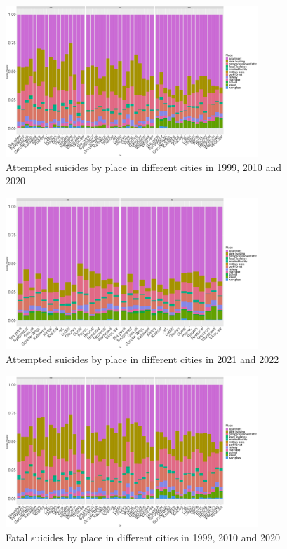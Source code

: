 \documentclass{article}
\begin{document}
\begin{figure}[H]
    \centering
    \includegraphics[width=0.85\textwidth]{imgs/place_city_att_suicides-991020.pdf}
    \caption{Attempted suicides by place in different cities in 1999, 2010 and 2020}
    \label{fig:place_city_att_suicides-991020}
\end{figure}
%
\begin{figure}[H]
    \centering
    \includegraphics[width=0.85\textwidth]{imgs/place_city_att_suicides-2122.pdf}
    \caption{Attempted suicides by place in different cities in 2021 and 2022}
    \label{fig:place_city_att_suicides-2122}
\end{figure}
%
\begin{figure}[H]
    \centering
    \includegraphics[width=0.85\textwidth]{imgs/place_city_fat_suicides-991020.pdf}
    \caption{Fatal suicides by place in different cities in 1999, 2010 and 2020}
    \label{fig:place_city_fat_suicides-991020}
\end{figure}
\end{document}
